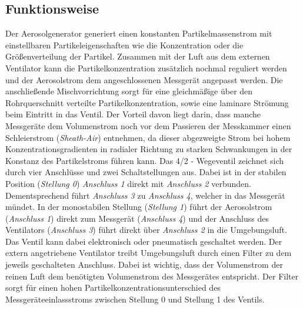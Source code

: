 \newpage

\subsection{Funktionsweise}
Der Aerosolgenerator generiert einen konstanten Partikelmassenstrom mit einstellbaren Partikeleigenschaften wie die Konzentration oder die Gr\"{o}{\ss}enverteilung der Partikel. Zusammen mit der Luft aus dem externen Ventilator kann die Partikelkonzentration zus\"{a}tzlich nochmal reguliert werden und der Aerosolstrom dem angeschlossenen Messger\"{a}t angepasst werden. Die anschlie{\ss}ende Mischvorrichtung sorgt f\"{u}r eine gleichm\"{a}{\ss}ige \"{u}ber den Rohrquerschnitt verteilte Partikelkonzentration, sowie eine laminare Str\"{o}mung beim Eintritt in das Ventil. Der Vorteil davon liegt darin, dass manche Messger\"{a}te dem Volumenstrom noch vor dem Passieren der Messkammer einen Schleierstrom (\textit{Sheath-Air}) entnehmen, da dieser abgezweigte Strom bei hohem Konzentrationsgradienten in radialer Richtung zu starken Schwankungen in der Konstanz des Partikelstroms f\"{u}hren kann. Das 4/2 - Wegeventil zeichnet sich durch vier Anschl\"{u}sse und zwei Schaltstellungen aus. Dabei ist in der stabilen Position (\textit{Stellung 0}) \textit{Anschluss 1} direkt mit \textit{Anschluss 2} verbunden. Dementsprechend f\"{u}hrt \textit{Anschluss 3} zu \textit{Anschluss 4}, welcher in das Messger\"{a}t m\"{u}ndet. In der monostabilen Stellung (\textit{Stellung 1}) f\"{u}hrt der Aerosolstrom (\textit{Anschluss 1}) direkt zum Messger\"{a}t (\textit{Anschluss 4}) und der Anschluss des Ventilators (\textit{Anschluss 3}) f\"{u}hrt direkt \"{u}ber \textit{Anschluss 2} in die Umgebungsluft. Das Ventil kann dabei elektronisch oder pneumatisch geschaltet werden. Der extern angetriebene Ventilator treibt Umgebungsluft durch einen Filter zu dem jeweils geschalteten Anschluss. Dabei ist wichtig, dass der Volumenstrom der reinen Luft dem ben\"{o}tigten Volumenstrom des Messger\"{a}tes entspricht. Der Filter sorgt f\"{u}r einen hohen Partikelkonzentrationsunterschied des Messger\"{a}teeinlassstroms zwischen Stellung 0 und Stellung 1 des Ventils.

